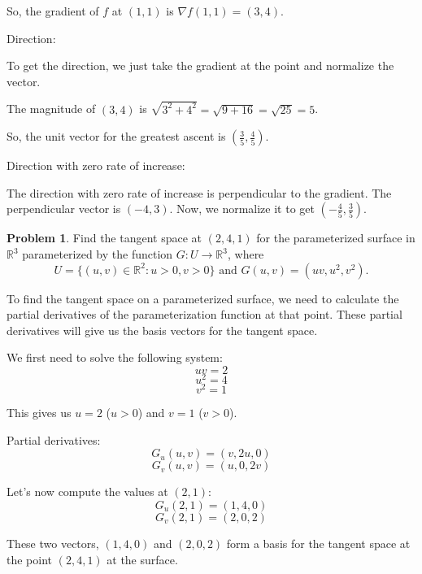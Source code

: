 \documentclass[12]{amsart}
\theoremstyle{definition}
\newtheorem{xca}{Problem}
\newcommand{\R}{\mathbb{R}}
\newcommand{\sskip}{\newpage%
}
\begin{document}
So, the gradient of $f$ at $(1, 1)$ is $\nabla f(1, 1) = (3, 4)$.


Direction:

To get the direction, we just take the gradient at the point and normalize the vector.

The magnitude of $(3, 4)$ is $\sqrt{3^2 + 4^2} = \sqrt{9 + 16} = \sqrt{25} = 5$.

So, the unit vector for the greatest ascent is $\left(\frac{3}{5}, \frac{4}{5}\right)$.


Direction with zero rate of increase:

The direction with zero rate of increase is perpendicular to the gradient.
The perpendicular vector is $(-4, 3)$. Now, we normalize it to get
$\left(-\frac{4}{5}, \frac{3}{5}\right)$.


\sskip

\begin{xca} %

\bigskip

Find the tangent space at $(2,4,1)$ for the parameterized surface in $\R^3$ parameterized by the function $G:U\to\R^3$, where
$$
U=\{(u,v)\in\R^2: u>0, v>0\}\text{ and } G(u,v)=(uv,u^2,v^2).
$$
\end{xca}


To find the tangent space on a parameterized surface, we need to calculate
the partial derivatives of the parameterization function at that point.
These partial derivatives will give us the basis vectors for the tangent space.

We first need to solve the following system:
\[uv = 2\]
\[u^2 = 4\]
\[v^2 = 1\]

This gives us $u = 2$ ($u > 0$) and $v = 1$ ($v > 0$).

Partial derivatives:
\[G_u(u, v) = (v, 2u, 0)\]
\[G_v(u, v) = (u, 0, 2v)\]

Let's now compute the values at $(2, 1)$:
\[G_u(2, 1) = (1, 4, 0)\]
\[G_v(2, 1) = (2, 0, 2)\]

These two vectors, $(1, 4, 0)$ and $(2, 0, 2)$ form a basis for the
tangent space at the point $(2, 4, 1)$ at the surface.
\end{document}
